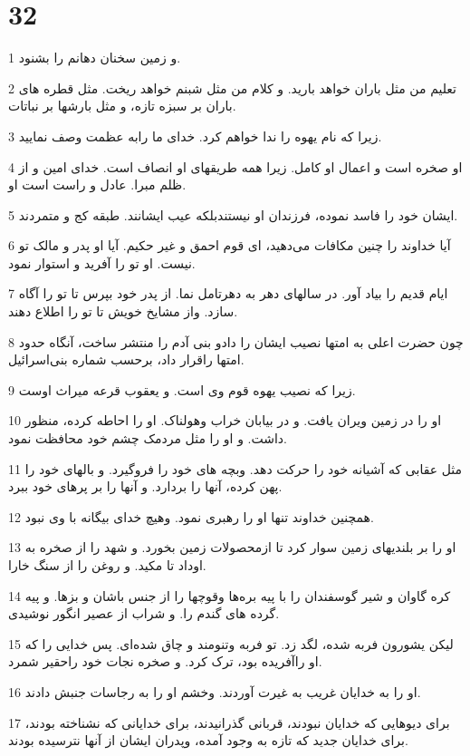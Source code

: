 \chapter{32}

\par 1 و زمین سخنان دهانم را بشنود.
\par 2 تعلیم من مثل باران خواهد بارید. و کلام من مثل شبنم خواهد ریخت. مثل قطره های باران بر سبزه تازه، و مثل بارشها بر نباتات.
\par 3 زیرا که نام یهوه را ندا خواهم کرد. خدای ما رابه عظمت وصف نمایید.
\par 4 او صخره است و اعمال او کامل. زیرا همه طریقهای او انصاف است. خدای امین و از ظلم مبرا. عادل و راست است او.
\par 5 ایشان خود را فاسد نموده، فرزندان او نیستندبلکه عیب ایشانند. طبقه کج و متمردند.
\par 6 آیا خداوند را چنین مکافات می‌دهید، ای قوم احمق و غیر حکیم. آیا او پدر و مالک تو نیست. او تو را آفرید و استوار نمود.
\par 7 ایام قدیم را بیاد آور. در سالهای دهر به دهرتامل نما. از پدر خود بپرس تا تو را آگاه سازد. واز مشایخ خویش تا تو را اطلاع دهند.
\par 8 چون حضرت اعلی به امتها نصیب ایشان را دادو بنی آدم را منتشر ساخت، آنگاه حدود امتها راقرار داد، برحسب شماره بنی‌اسرائیل.
\par 9 زیرا که نصیب یهوه قوم وی است. و یعقوب قرعه میراث اوست.
\par 10 او را در زمین ویران یافت. و در بیابان خراب وهولناک. او را احاطه کرده، منظور داشت. و او را مثل مردمک چشم خود محافظت نمود.
\par 11 مثل عقابی که آشیانه خود را حرکت دهد. وبچه های خود را فرو‌گیرد. و بالهای خود را پهن کرده، آنها را بردارد. و آنها را بر پرهای خود ببرد.
\par 12 همچنین خداوند تنها او را رهبری نمود. وهیچ خدای بیگانه با وی نبود.
\par 13 او را بر بلندیهای زمین سوار کرد تا ازمحصولات زمین بخورد. و شهد را از صخره به اوداد تا مکید. و روغن را از سنگ خارا.
\par 14 کره گاوان و شیر گوسفندان را با پیه بره‌ها وقوچها را از جنس باشان و بزها. و پیه گرده های گندم را. و شراب از عصیر انگور نوشیدی.
\par 15 لیکن یشورون فربه شده، لگد زد. تو فربه وتنومند و چاق شده‌ای. پس خدایی را که او راآفریده بود، ترک کرد. و صخره نجات خود راحقیر شمرد.
\par 16 او را به خدایان غریب به غیرت آوردند. وخشم او را به رجاسات جنبش دادند.
\par 17 برای دیوهایی که خدایان نبودند، قربانی گذرانیدند، برای خدایانی که نشناخته بودند، برای خدایان جدید که تازه به وجود آمده، وپدران ایشان از آنها نترسیده بودند.
